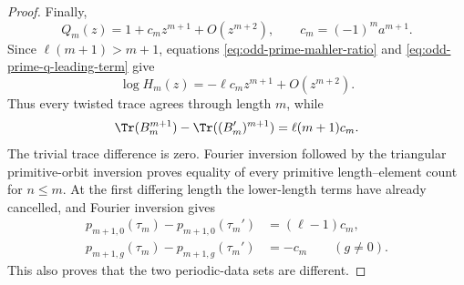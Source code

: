 \begin{proof}
Finally,
\begin{equation}\label{eq:odd-prime-q-leading-term}
 Q_m(z)=1+c_mz^{m+1}+O(z^{m+2}),
 \qquad c_m=(-1)^m a^{m+1}.
\end{equation}
Since \(\ell(m+1)>m+1\), equations
\eqref{eq:odd-prime-mahler-ratio} and
\eqref{eq:odd-prime-q-leading-term} give
\[
 \log H_m(z)=-\ell c_mz^{m+1}+O(z^{m+2}).
\]
Thus every twisted trace agrees through length \(m\), while
\[
 \Tr(B_m^{m+1})-\Tr((B_m')^{m+1})
 =\ell(m+1)c_m.
\]
The trivial trace difference is zero.  Fourier inversion followed by the
triangular primitive-orbit inversion proves equality of every primitive
length--element count for \(n\le m\).  At the first differing length the
lower-length terms have already cancelled, and Fourier inversion gives
\begin{equation}\label{eq:odd-prime-first-discrepancy}
 \begin{aligned}
 p_{m+1,0}(\tau_m)-p_{m+1,0}(\tau_m')&=(\ell-1)c_m,\\
 p_{m+1,g}(\tau_m)-p_{m+1,g}(\tau_m')&=-c_m
 \qquad(g\ne0).
 \end{aligned}
\end{equation}
This also proves that the two periodic-data sets are different.
\end{proof}
